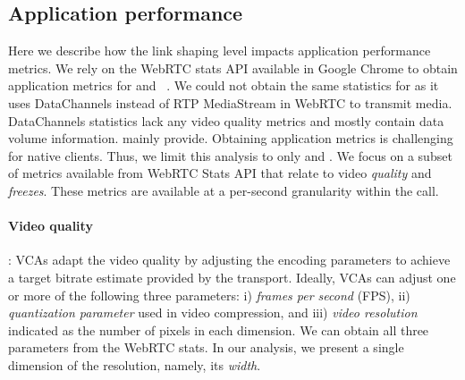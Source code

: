 \subsection{Application performance}
\label{subsec:application_performance}
Here we describe how the link shaping level impacts application performance metrics. %
We rely on the WebRTC stats API available in Google Chrome to obtain application metrics for \teamsbrowser and \meet~\cite{webrtc_stats}. We could not obtain the same statistics for \zoombrowser as it uses DataChannels instead of RTP MediaStream in WebRTC to transmit media. DataChannels statistics lack any video quality metrics and mostly contain data volume information. mainly provide. Obtaining application metrics is challenging for native clients.  %
Thus, we limit this analysis to only \meet and \teamsbrowser. We focus on a subset of metrics available from WebRTC Stats API that relate to video \textit{quality} and \textit{freezes}. These metrics are available at a per-second granularity within the call. %


\paragraph{Video quality}: VCAs adapt the video quality by adjusting the encoding parameters to achieve a target bitrate estimate provided by the transport. Ideally, VCAs can adjust one or more of the following three parameters: i) \emph{frames per second} (FPS), ii) \textit{quantization parameter} used in video compression, and  iii) \textit{video resolution} indicated as the number of pixels in each dimension. We can obtain all three parameters from the WebRTC stats. In our analysis, we present a single dimension of the resolution, namely, its \textit{width}. 

